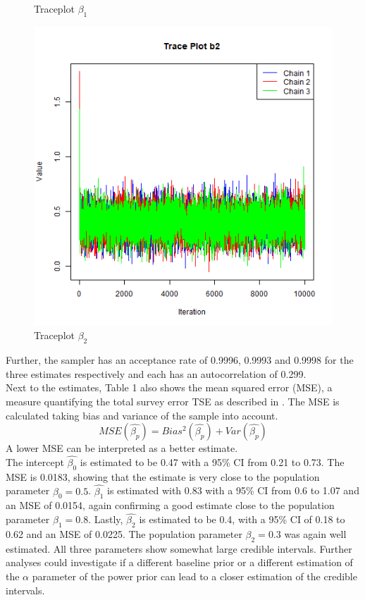 \documentclass[10.5pt]{article}
\begin{document}
\begin{figure}[htbp]
\begin{minipage}[b]{0.3\textwidth}
    \caption{Traceplot \(\beta_1\)}
    \label{fig:traceplot2}
  \end{minipage}
  \hfill
  \begin{minipage}[b]{0.3\textwidth}
    \centering
    \includegraphics[width=\textwidth]{../results/trace_plot_b2.png}
    \caption{Traceplot \(\beta_2\)}
    \label{fig:traceplot3}
  \end{minipage}
\end{figure}
Further, the sampler has an acceptance rate of 0.9996, 0.9993 and 0.9998 for the three estimates respectively and each has an autocorrelation of 0.299.\\
Next to the estimates, Table 1 also shows the mean squared error (MSE), a measure quantifying the total survey error TSE as described in \cite{biemer2010total}. The MSE is calculated taking bias and variance of the sample into account.
\begin{equation}
    MSE(\hat{\beta_p}) = Bias^2(\hat{\beta_p}) + Var(\hat{\beta_p}) 
\end{equation}
A lower MSE can be interpreted as a better estimate. \\
The intercept \(\hat{\beta_0}\) is estimated to be 0.47 with a 95\% CI from 0.21 to 0.73. The MSE is 0.0183, showing that the estimate is very close to the population parameter \(\beta_0 = 0.5\). \(\hat{\beta_1}\) is estimated with 0.83 with a 95\% CI from 0.6 to 1.07 and an MSE of 0.0154, again confirming a good estimate close to the population parameter \(\beta_1 = 0.8\). Lastly, \(\hat{\beta_2}\) is estimated to be 0.4, with a 95\% CI of 0.18 to 0.62 and an MSE of 0.0225. The population parameter \(\beta_2 = 0.3\) was again well estimated. All three parameters show somewhat large credible intervals. Further analyses could investigate if a different baseline prior or a different estimation of the \(\alpha\) parameter of the power prior can lead to a closer estimation of the credible intervals. \\
\end{document}
